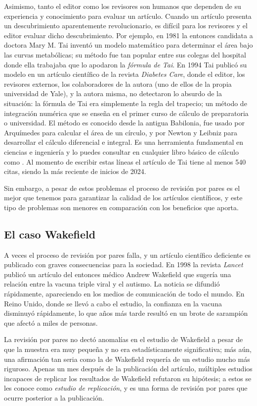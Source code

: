 Asimismo, tanto el editor como los revisores son humanos que dependen de su experiencia y conocimiento para evaluar un artículo.
Cuando un artículo presenta un descubrimiento aparentemente revolucionario, es difícil para los revisores y el editor evaluar dicho descubrimiento.
Por ejemplo, en 1981 la entonces candidata a doctora Mary M.
Tai inventó un modelo matemático para determinar el área bajo las curvas metabólicas; su método fue tan popular entre sus colegas del hospital donde ella trabajaba que lo apodaron la \emph{fórmula de Tai}.
En 1994 Tai publicó su modelo en un artículo científico de la revista \emph{Diabetes Care}\cite{Tai1994}, donde el editor, los revisores externos, los colaboradores de la autora (uno de ellos de la propia universidad de Yale), y la autora misma, no detectaron lo absurdo de la situación: la fórmula de Tai era simplemente la regla del trapecio; un método de integración numérica que se enseña en el primer curso de cálculo de preparatoria o universidad.
El método es conocido desde la antigua Babilonia, fue usado por Arquímedes para calcular el área de un círculo, y por Newton y Leibniz para desarrollar el cálculo diferencial e integral.
Es una herramienta fundamental en ciencias e ingeniería y lo puedes consultar en cualquier libro básico de cálculo como \cite{Arizmendi2018}.
Al momento de escribir estas líneas el artículo de Tai tiene al menos 540 citas, siendo la más reciente de inicios de 2024.

Sin embargo, a pesar de estos problemas el proceso de revisión por pares es el mejor que tenemos para garantizar la calidad de los artículos científicos, y este tipo de problemas son menores en comparación con los beneficios que aporta.

\subsection*{El caso Wakefield}
A veces el proceso de revisión por pares falla, y un artículo científico deficiente es publicado con graves consecuencias para la sociedad.
En 1998 la revista \emph{Lancet} publicó un artículo del entonces médico Andrew Wakefield que sugería una relación entre la vacuna triple viral y el autismo.
La noticia se difundió rápidamente, apareciendo en los medios de comunicación de todo el mundo.
En Reino Unido, donde se llevó a cabo el estudio, la confianza en la vacuna disminuyó rápidamente, lo que años más tarde resultó en un brote de sarampión que afectó a miles de personas.

La revisión por pares no dectó anomalías en el estudio de Wakefield a pesar de que la muestra era muy pequeña y no era estadísticamente significativa; más aún, una afirmación tan seria como la de Wakefield requería de un estudio mucho más riguroso.
Apenas un mes después de la publicación del artículo, múltiples estudios incapaces de replicar los resultados de Wakefield refutaron su hipótesis; a estos se les conoce como \emph{estudio de replicación}, y es una forma de revisión por pares que ocurre posterior a la publicación.

